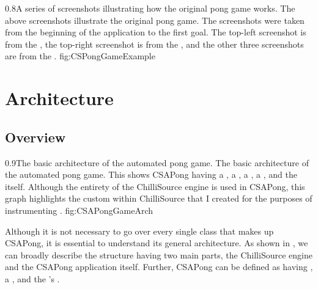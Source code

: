 {0.8}{A series of screenshots illustrating how the original pong game works.}
{The above screenshots illustrate the original pong game. The screenshots were taken from the beginning of the application to the first goal. The top-left screenshot is from the , the top-right screenshot is from the , and the other three screenshots are from the .}
{fig:CSPongGameExample}

\section{Architecture}\label{sec:game_arch}

\subsection{Overview}\label{ssec:game_arch_overview}

{0.9}{The basic architecture of the automated pong game.}
{The basic architecture of the automated pong game. This shows CSAPong having a , a , a , a , and the  itself. Although the entirety of the ChilliSource engine is used in CSAPong, this graph highlights the custom  within ChilliSource that I created for the purposes of instrumenting .}
{fig:CSAPongGameArch}

Although it is not necessary to go over every single class that makes up CSAPong, it is essential to understand its general architecture. As shown in , we can broadly describe the structure having two main parts, the ChilliSource engine\footnotemark $ $ and the CSAPong application itself. Further, CSAPong can be defined as having , a , and the 's .

